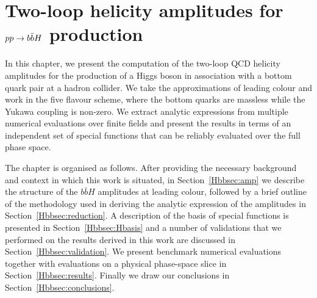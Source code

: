 \documentclass[main.tex]{subfiles}
\begin{document}
\chapter{Two-loop helicity amplitudes for $pp \rightarrow b\bar{b}H$ production} \label{sec:Hbb}
In this chapter, we present the computation of the two-loop QCD helicity amplitudes for the production of a Higgs boson in association with a bottom quark pair at a hadron collider. We take the approximations of leading colour and work in the five flavour scheme, where the bottom quarks are massless while the Yukawa coupling is non-zero. We extract analytic expressions from multiple numerical evaluations over finite fields and present the results in terms of an independent set of special functions that can be reliably evaluated over the full phase space.

The chapter is organised as follows. After providing the necessary background and context in which this work is situated, in Section~\ref{Hbbsec:amp} we describe the structure of the $b\bar{b}H$ amplitudes at leading colour, followed by a brief outline of the methodology used in deriving the analytic expression of the amplitudes in Section~\ref{Hbbsec:reduction}. A description of the basis of special functions is presented in Section~\ref{Hbbsec:Hbasis} and a number of validations that we performed on the results derived in this work are discussed in Section~\ref{Hbbsec:validation}. We present benchmark numerical evaluations together with evaluations on a physical phase-space slice in Section~\ref{Hbbsec:results}. Finally we draw our conclusions in Section~\ref{Hbbsec:conclusions}. 
\end{document}
